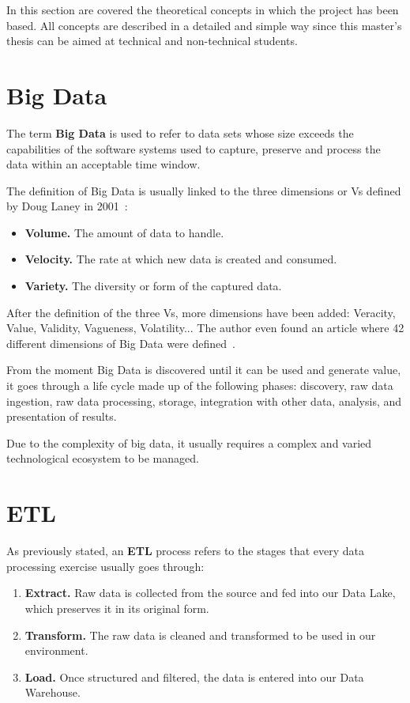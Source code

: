 
\nonzeroparskip In this section are covered the theoretical concepts in which the project has been based. All concepts are described in a detailed and simple way since this master's thesis can be aimed at technical and non-technical students.

\section{Big Data}

\nonzeroparskip The term \textbf{Big Data} is used to refer to data sets whose size exceeds the capabilities of the software systems used to capture, preserve and process the data within an acceptable time window.

\nonzeroparskip The definition of Big Data is usually linked to the three dimensions or Vs defined by Doug Laney in 2001~\cite{bigdata_vs}:
\begin{itemize}
	\item \textbf{Volume.} The amount of data to handle.
	\item \textbf{Velocity.} The rate at which new data is created and consumed.
	\item \textbf{Variety.} The diversity or form of the captured data.
\end{itemize}

\nonzeroparskip After the definition of the three Vs, more dimensions have been added: Veracity, Value, Validity, Vagueness, Volatility... The author even found an article where 42 different dimensions of Big Data were defined~\cite{bigdata_vs}.

\nonzeroparskip From the moment Big Data is discovered until it can be used and generate value, it goes through a life cycle made up of the following phases: discovery, raw data ingestion, raw data processing, storage, integration with other data, analysis, and presentation of results.

\nonzeroparskip Due to the complexity of big data, it usually requires a complex and varied technological ecosystem to be managed.

\section{ETL}
\nonzeroparskip As previously stated, an \textbf{ETL} process refers to the stages that every data processing exercise usually goes through:
\begin{enumerate}
	\item \textbf{Extract.} Raw data is collected from the source and fed into our Data Lake, which preserves it in its original form.
	\item \textbf{Transform.} The raw data is cleaned and transformed to be used in our environment.
	\item \textbf{Load.} Once structured and filtered, the data is entered into our Data Warehouse.
\end{enumerate}

